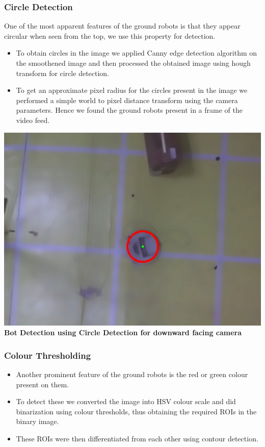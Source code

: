 \documentclass[12pt]{article}
\begin{document}
        \subsubsection{Circle Detection}
        One of the most apparent features of the ground robots is that they appear circular when seen from the top, we use this property for detection.
            \begin{itemize}
                \item To obtain circles in the image we applied Canny edge detection algorithm on the smoothened image and then processed the obtained image using hough transform for circle detection.
                \item To get an approximate pixel radius for the circles present in the image we performed a simple world to pixel distance transform using the camera parameters.
Hence we found the ground robots present in a frame of the video feed.\\
            \end{itemize} 
    \begin{center}\includegraphics[scale=0.2]{Pic2} \\
    \textbf{Bot Detection using Circle Detection for downward facing camera}\end{center}
       \subsubsection{Colour Thresholding}
       		\begin{itemize}
       			\item Another prominent feature of the ground robots is the red or green colour present on them.
				\item To detect these we converted the image into HSV colour scale and did binarization using colour thresholds, thus obtaining the required ROIs in the binary image.
				\item These ROIs were then differentiated from each other using contour detection. 
       		\end{itemize}
\end{document}

